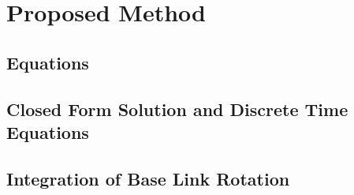 \documentclass[main.tex]{subfiles}
\begin{document}
\section{Proposed Method}\label{sec:proposedmethods}
\label{sec:method}
\subsection{Equations}
\subsection{Closed Form Solution and Discrete Time Equations}
\subsection{Integration of Base Link Rotation}
\end{document}
